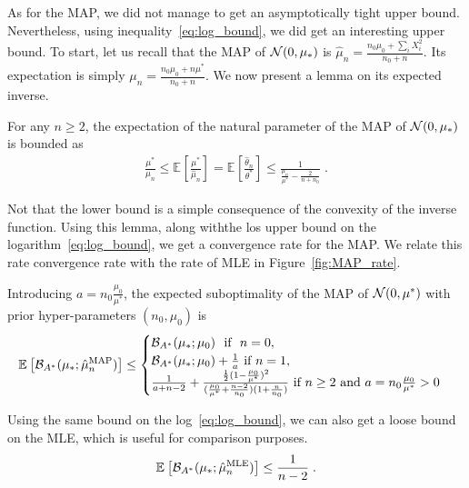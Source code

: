 \documentclass{article}
\newcommand*{\expect}[2][]{\ensuremath{\mathbb{E}_{#1} \left[ #2 \right] }} %
\newcommand{\logpart}{A}
\newcommand{\bregmanconj}{\cB_{\logpart^*}}
\newcommand{\natp}{\theta}
\newcommand{\MAPm}{\hat \mu_n}
\newcommand{\MAPt}{\hat \natp_n}
\begin{document}
\begin{example}
As for the MAP, we did not manage to get an asymptotically tight upper bound. Nevertheless, using inequality~\eqref{eq:log_bound}, we did get an interesting upper bound. 
To start, let us recall that the MAP of ${\mathcal N}(0,\mu_*)$ is $\hat \mu_n = \frac{n_0 \mu_0 + \sum_i X_i^2}{n_0 + n}$.
Its expectation is simply $\mu_n= \frac{n_0 \mu_0 + n \mu^*}{n_0 + n}$.
We now present a lemma on its expected inverse.
\begin{lemma}
	For any $n\geq 2$, the expectation of the natural parameter of the MAP of ${\mathcal N}(0,\mu_*)$ is bounded as
	\begin{align}
		\frac{\mu^*}{\mu_n}
		\leq \expect{\frac{\mu^*}{\MAPm}} 
		= \expect{\frac{\MAPt}{\natp^*}} 
		\leq \frac{1}{\frac{\mu_n}{\mu^*} - \frac{2}{n+n_0}} \; .
	\end{align}
\end{lemma}
Not that the lower bound is a simple consequence of the convexity of the inverse function. Using this lemma, along withthe los upper bound on the logarithm~\eqref{eq:log_bound}, we get a convergence rate for the MAP. We relate this rate convergence rate with the rate of MLE in Figure~\ref{fig:MAP_rate}.
\begin{theorem}
 Introducing $a=n_0 \frac{\mu_0}{\mu^*}$, the expected suboptimality of the MAP of ${\mathcal N}(0,\mu^*)$ with prior hyper-parameters $(n_0,\mu_0)$ is 
\begin{equation}
	\expect{\bregmanconj( \mu_*; \hat \mu_n^\text{MAP})}
	\leq \begin{cases}
		\bregmanconj( \mu_*; \mu_0) \ \text{ if } \ n=0, \\
		\bregmanconj( \mu_*; \mu_0) + \inv{a} \ \text{if}\ n=1,\\
		\frac{1}{a+n-2} + \frac{\half(1 - \frac{\mu_0}{\mu^*})^2}{(\frac{\mu_0}{\mu^*}+\frac{n-2}{n_0})(1 + \frac{n}{n_0} )} \ \text{if}\  n\geq 2 \ \text{and}\ a=n_0 \frac{\mu_0}{\mu^*} >0
	\end{cases}
	\label{eq:MAP_rate}
\end{equation}
\end{theorem}
Using the same bound on the log~\eqref{eq:log_bound}, we can also get a loose bound on the MLE, which is useful for comparison purposes.
\begin{equation}
	\expect{\bregmanconj( \mu_*; \hat \mu_n^\text{MLE}) }
	\leq \inv{n-2} \; .
	\label{eq:MLE_loose_rate}
\end{equation}

\end{example}
\end{document}
